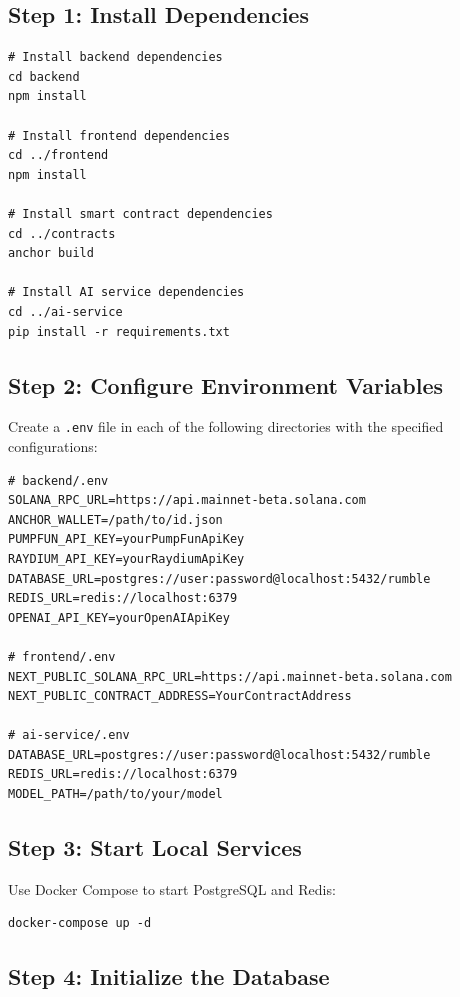 \documentclass[11pt,a4paper]{article}
\begin{document}
\subsection{Step 1: Install Dependencies}

\begin{verbatim}
# Install backend dependencies
cd backend
npm install

# Install frontend dependencies
cd ../frontend
npm install

# Install smart contract dependencies
cd ../contracts
anchor build

# Install AI service dependencies
cd ../ai-service
pip install -r requirements.txt
\end{verbatim}

\subsection{Step 2: Configure Environment Variables}

Create a \texttt{.env} file in each of the following directories with the specified configurations:

\begin{verbatim}
# backend/.env
SOLANA_RPC_URL=https://api.mainnet-beta.solana.com
ANCHOR_WALLET=/path/to/id.json
PUMPFUN_API_KEY=yourPumpFunApiKey
RAYDIUM_API_KEY=yourRaydiumApiKey
DATABASE_URL=postgres://user:password@localhost:5432/rumble
REDIS_URL=redis://localhost:6379
OPENAI_API_KEY=yourOpenAIApiKey

# frontend/.env
NEXT_PUBLIC_SOLANA_RPC_URL=https://api.mainnet-beta.solana.com
NEXT_PUBLIC_CONTRACT_ADDRESS=YourContractAddress

# ai-service/.env
DATABASE_URL=postgres://user:password@localhost:5432/rumble
REDIS_URL=redis://localhost:6379
MODEL_PATH=/path/to/your/model
\end{verbatim}

\subsection{Step 3: Start Local Services}

Use Docker Compose to start PostgreSQL and Redis:

\begin{verbatim}
docker-compose up -d
\end{verbatim}

\subsection{Step 4: Initialize the Database}
\end{document}
